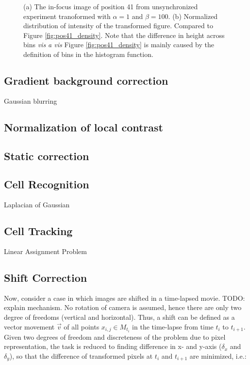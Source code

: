 \documentclass[pdftex,12pt,a4paper]{report}
\begin{document}
\begin{figure}[H]
\caption{(a) The in-focus image of position 41 from unsynchronized experiment tranoformed with $\alpha=1$ and $\beta = 100$. (b) Normalized distribution of intensity of the transformed figure. Compared to Figure \ref{fig:pos41_density}. Note that the difference in height across bins \textit{vis a vis} Figure \ref{fig:pos41_density} is mainly caused by the definition of bins in the histogram function.}

\label{fig:trench_masking}
\end{figure}

\subsection{Gradient background correction}

\label{subsection:gradient_background_correction}

Gaussian blurring

\subsection{Normalization of local contrast}

\subsection{Static correction}

\subsection{Cell Recognition}

Laplacian of Gaussian

\subsection{Cell Tracking}

Linear Assignment Problem

\subsection{Shift Correction}

Now, consider a case in which images are shifted in a time-lapsed movie. TODO: explain mechanism. No rotation of camera is assumed, hence there are only two degree of freedoms (vertical and horizontal). Thus, a shift can be defined as a vector movement $\vec{v}$ of all points $x_{i,j} \in M_{t_i}$ in the time-lapse from time $t_i$ to $t_{i+1}$. Given two degrees of freedom and discreteness of the problem due to pixel representation, the task is reduced to finding difference in x- and y-axis ($\delta_x$ and $\delta_y$), so that the difference of transformed pixels at $t_i$ and $t_{i+1}$ are minimized, i.e.:
\end{document}
